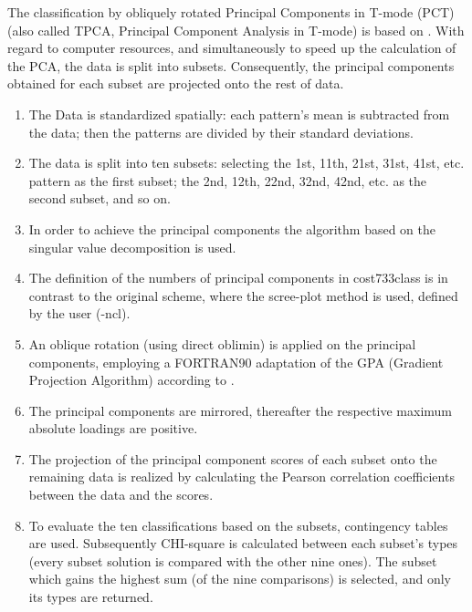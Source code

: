 \documentclass[12pt, oneside, a4paper, headsepline, plainheadsepline]{scrbook}
\begin{document}
The classification by obliquely rotated Principal Components in T-mode (PCT) (also called TPCA, Principal Component Analysis in T-mode) is based on \citet{Huth2000}. With regard to computer resources, and simultaneously to speed up the calculation of the PCA, the data is split into subsets. Consequently, the principal components obtained for each subset are projected onto the rest of data.
\begin{enumerate}
\item The Data is standardized spatially: each pattern's mean is subtracted from the data; then the patterns are divided by their standard deviations.
\item The data is split into ten subsets: selecting the 1st, 11th, 21st, 31st, 41st, etc. pattern as the first subset; the 2nd, 12th, 22nd, 32nd, 42nd, etc. as the second subset, and so on.
\item In order to achieve the principal components the algorithm based on the singular value decomposition is used.
\item The definition of the numbers of principal components in cost733class is in contrast to the original scheme, where the scree-plot method is used, defined by the user (-ncl).
\item An oblique rotation (using direct oblimin) is applied on the principal components, employing a FORTRAN90 adaptation of the GPA (Gradient Projection Algorithm) according to \citet{Bernaards2005}.
\item The principal components are mirrored, thereafter the respective maximum absolute loadings are positive.
\item The projection of the principal component scores of each subset onto the remaining data is realized by calculating the Pearson correlation coefficients between the data and the scores.
\item To evaluate the ten classifications based on the subsets, contingency tables are used. Subsequently CHI-square is calculated between each subset's types (every subset solution is compared with the other nine ones). The subset which gains the highest sum (of the nine comparisons) is selected, and only its types are returned.
\end{enumerate}
\end{document}
